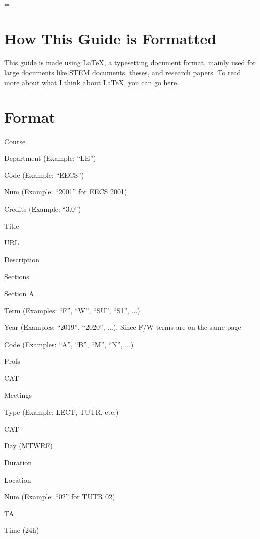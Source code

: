 \emergencystretch=\maxdimen
{}

\maketitle              %

\section{How This Guide is Formatted}
This guide is made using \LaTeX{}, a typesetting document format, mainly used
for large documents like STEM documents, theses, and research papers. To read
more about what I think about \LaTeX{}, you
\href{https://husseinesmail.xyz/articles/is-latex-better.html}{can go here}.

\section{Format}
\noindent Course
\begin{itemize*}
	\item Department (Example: ``LE'')
	\item Code (Example: ``EECS'')
	\item Num (Example: ``2001'' for EECS 2001)
	\item Credits (Example: ``3.0'')
	\item Title
	\item URL
	\item Description
	\item Sections
	\begin{itemize*}
		\item Section A
		\begin{itemize*}
			\item Term (Examples: ``F'', ``W'', ``SU'', ``S1'', ...)
			\item Year (Examples: ``2019'', ``2020'', ...). Since F/W terms are on the same page
			\item Code (Examples: ``A'', ``B'', ``M'', ``N'', ...)
			\item Profs
			\item CAT
			\item Meetings
			\begin{itemize*}
				\item Type (Example: LECT, TUTR, etc.)
				\item CAT
				\item Day (MTWRF)
				\item Duration
				\item Location
				\item Num (Example: ``02'' for TUTR 02)
				\item TA
				\item Time (24h)
			\end{itemize*}
		\end{itemize*}
	\end{itemize*}
\end{itemize*}


